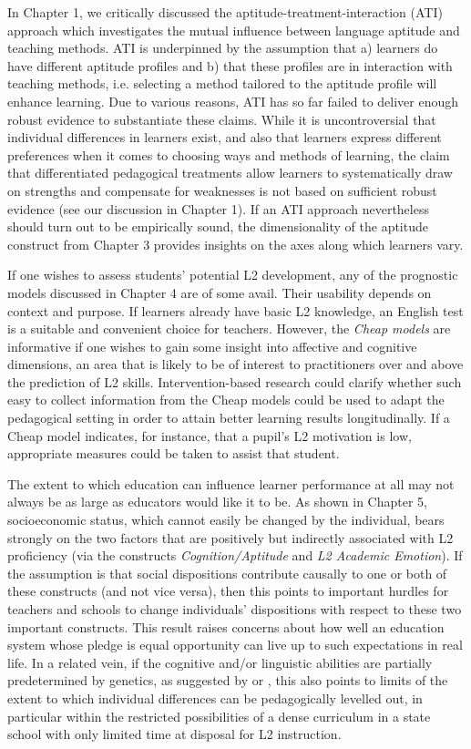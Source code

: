 \documentclass[output=paper]{langsci/langscibook}
\begin{document}
In Chapter 1, we critically discussed the aptitude-treatment-interaction (ATI) approach which investigates the mutual influence between language aptitude and teaching methods. ATI is underpinned by the assumption that a) learners do have different aptitude profiles and b) that these profiles are in interaction with teaching methods, i.e. selecting a method tailored to the aptitude profile will enhance learning. Due to various reasons, ATI has so far failed to deliver enough robust evidence to substantiate these claims. While it is uncontroversial that individual differences in learners exist, and also that learners express different preferences when it comes to choosing ways and methods of learning, the claim that differentiated pedagogical treatments allow learners to systematically draw on strengths and compensate for weaknesses is not based on sufficient robust evidence (see our discussion in Chapter 1). If an ATI approach nevertheless should turn out to be empirically sound, the dimensionality of the aptitude construct from Chapter 3 provides insights on the axes along which learners vary.

If one wishes to assess students’ potential L2 development, any of the prognostic models discussed in Chapter 4 are of some avail. Their usability depends on context and purpose. If learners already have basic L2 knowledge, an English test is a suitable and convenient choice for teachers. However, the \textit{Cheap models} are informative if one wishes to gain some insight into affective and cognitive dimensions, an area that is likely to be of interest to practitioners over and above the prediction of L2 skills. Intervention-based research could clarify whether such easy to collect information from the Cheap models could be used to adapt the pedagogical setting in order to attain better learning results longitudinally. If a Cheap model indicates, for instance, that a pupil’s L2 motivation is low, appropriate measures could be taken to assist that student. 

The extent to which education can influence learner performance at all may not always be as large as educators would like it to be. As shown in Chapter 5, socioeconomic status, which cannot easily be changed by the individual, bears strongly on the two factors that are positively but indirectly associated with L2 proficiency (via the constructs \textit{Cognition/Aptitude} and \textit{L2 Academic Emotion}). If the assumption is that social dispositions contribute causally to one or both of these constructs (and not vice versa), then this points to important hurdles for teachers and schools to change individuals’ dispositions with respect to these two important constructs. This result raises concerns about how well an education system whose pledge is equal opportunity can live up to such expectations in real life. In a related vein, if the cognitive and/or linguistic abilities are partially predetermined by genetics, as suggested by \citet{Plomin2019} or \citet{Stromswold2001}, this also points to limits of the extent to which individual differences can be pedagogically levelled out, in particular within the restricted possibilities of a dense curriculum in a state school with only limited time at disposal for L2 instruction.
\end{document}
